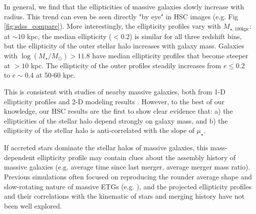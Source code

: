 \documentclass[a4paper,fleqn,usenatbib]{mnras}
\def\logms{{$\log (M_{\star}/M_{\odot})$}}
\def\mtot{{$M_{\star,100\mathrm{kpc}}$}}
\def\mden{{$\mu_{\star}$}}
\begin{document}
	In general, we find that the ellipticities of massive galaxies slowly increase with radius. This trend can even be seen directly "by eye" in HSC images (e.g. Fig \ref{fig:sdss_compare}). More interestingly, the ellipticity profiles vary with  \mtot{}: 
	at ${\sim} 10$ kpc, the median ellipticity ($< 0.2$) is similar for all three redshift bins,  but the ellipticity of the outer stellar halo increases with galaxy mass. Galaxies with  \logms{}$>11.8$ have median ellipticity profiles that become steeper at $>10$ kpc. The ellipticity of the outer profiles steadily increases from $e\le 0.2$ to $e{\sim} 0.4$ at 50-60 kpc.
    
	This is consistent with studies of nearby massive galaxies, both from 1-D 
	ellipticity profiles and 2-D modeling results \citep{Porter1991, Gonzalez2005, 
	Zibetti2005, Spavone2017, Huang2013a, Oh2017}. However,  to the best of our knowledge, our HSC results are the first to show  clear evidence that:  a) the ellipticities of the stellar halo  depend strongly on galaxy mass, and b)  the ellipticity of the stellar halo is anti-correlated with the slope of \mden{}.
    
	If accreted stars dominate the stellar halos of massive galaxies, this 
	mass-dependent ellipticity profile may contain clues about the assembly history of massive galaxies (e.g. average time since last merger, 
	average merger mass ratio).
	Previous simulations often focused on reproducing the rounder average shape 
	and slow-rotating nature of massive ETGs (e.g. \citealt{Wu2014}), and the 
	projected ellipticity profiles and their correlations with the kinematic of 
	stars and merging history have not been well explored. 
   
\end{document}
